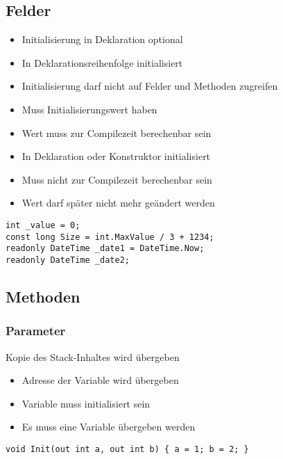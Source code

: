 \begin{multicols*}{2}
\subsection{Felder}
\begin{itemize}
    \item Initialisierung in Deklaration optional
    \item In Deklarationsreihenfolge initialisiert
    \item Initialisierung darf nicht auf Felder und Methoden zugreifen
\end{itemize}
\begin{itemize}
    \item Muss Initialisierungswert haben
    \item Wert muss zur Compilezeit berechenbar sein
\end{itemize}
\begin{itemize}
    \item In Deklaration oder Konstruktor initialisiert
    \item Muss nicht zur Compilezeit berechenbar sein
    \item Wert darf später nicht mehr geändert werden
\end{itemize}
\begin{lstlisting}
int _value = 0;
const long Size = int.MaxValue / 3 + 1234;
readonly DateTime _date1 = DateTime.Now; 
readonly DateTime _date2;
\end{lstlisting}


\subsection{Methoden}
\subsubsection{Parameter}
 Kopie des Stack-Inhaltes wird übergeben
\begin{itemize}
    \item Adresse der Variable wird übergeben
    \item Variable muss initialisiert sein
    \item Es muss eine Variable übergeben werden
\end{itemize}
\begin{lstlisting}
void Init(out int a, out int b) { a = 1; b = 2; }


\end{lstlisting}
\end{multicols*}
